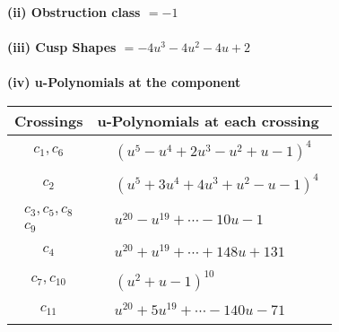 \documentclass[1p]{elsarticle_modified}
\theoremstyle{definition}
\begin{document}
\flushleft \textbf{(ii) Obstruction class $= -1$}\\~\\
\flushleft \textbf{(iii) Cusp Shapes $= -4 u^3-4 u^2-4 u+2$}\\~\\
\newpage\renewcommand{\arraystretch}{1}
\flushleft \textbf{(iv) u-Polynomials at the component}\newline \\
\begin{tabular}{m{50pt}|m{274pt}}
Crossings & \hspace{64pt}u-Polynomials at each crossing \\
\hline $$\begin{aligned}c_{1},c_{6}\end{aligned}$$&$\begin{aligned}
&(u^5- u^4+2 u^3- u^2+u-1)^4
\end{aligned}$\\
\hline $$\begin{aligned}c_{2}\end{aligned}$$&$\begin{aligned}
&(u^5+3 u^4+4 u^3+u^2- u-1)^4
\end{aligned}$\\
\hline $$\begin{aligned}c_{3},c_{5},c_{8}\\c_{9}\end{aligned}$$&$\begin{aligned}
&u^{20}- u^{19}+\cdots-10 u-1
\end{aligned}$\\
\hline $$\begin{aligned}c_{4}\end{aligned}$$&$\begin{aligned}
&u^{20}+u^{19}+\cdots+148 u+131
\end{aligned}$\\
\hline $$\begin{aligned}c_{7},c_{10}\end{aligned}$$&$\begin{aligned}
&(u^2+u-1)^{10}
\end{aligned}$\\
\hline $$\begin{aligned}c_{11}\end{aligned}$$&$\begin{aligned}
&u^{20}+5 u^{19}+\cdots-140 u-71
\end{aligned}$\\
\hline
\end{tabular}\\~\\
\end{document}

